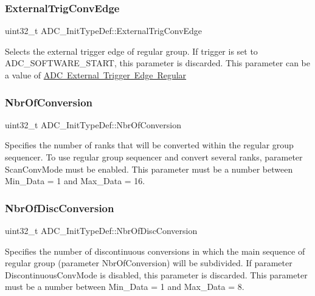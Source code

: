 \subsubsection{\texorpdfstring{ExternalTrigConvEdge}{ExternalTrigConvEdge}}
{\footnotesize\ttfamily uint32\+\_\+t A\+D\+C\+\_\+\+Init\+Type\+Def\+::\+External\+Trig\+Conv\+Edge}

Selects the external trigger edge of regular group. If trigger is set to A\+D\+C\+\_\+\+S\+O\+F\+T\+W\+A\+R\+E\+\_\+\+S\+T\+A\+RT, this parameter is discarded. This parameter can be a value of \mbox{\hyperlink{group___a_d_c___external__trigger__edge___regular}{A\+DC External Trigger Edge Regular}} \mbox{\label{struct_a_d_c___init_type_def_aa72b0cc3e8dac3a30097cf12093c42a7}} 
\subsubsection{\texorpdfstring{NbrOfConversion}{NbrOfConversion}}
{\footnotesize\ttfamily uint32\+\_\+t A\+D\+C\+\_\+\+Init\+Type\+Def\+::\+Nbr\+Of\+Conversion}

Specifies the number of ranks that will be converted within the regular group sequencer. To use regular group sequencer and convert several ranks, parameter \textquotesingle{}Scan\+Conv\+Mode\textquotesingle{} must be enabled. This parameter must be a number between Min\+\_\+\+Data = 1 and Max\+\_\+\+Data = 16. \mbox{\label{struct_a_d_c___init_type_def_a5c0078be814bfe2608ae5758826eafb8}} 
\subsubsection{\texorpdfstring{NbrOfDiscConversion}{NbrOfDiscConversion}}
{\footnotesize\ttfamily uint32\+\_\+t A\+D\+C\+\_\+\+Init\+Type\+Def\+::\+Nbr\+Of\+Disc\+Conversion}

Specifies the number of discontinuous conversions in which the main sequence of regular group (parameter Nbr\+Of\+Conversion) will be subdivided. If parameter \textquotesingle{}Discontinuous\+Conv\+Mode\textquotesingle{} is disabled, this parameter is discarded. This parameter must be a number between Min\+\_\+\+Data = 1 and Max\+\_\+\+Data = 8. \mbox{\label{struct_a_d_c___init_type_def_abebb8d3277cb9a5aae72578076762f5d}} 
